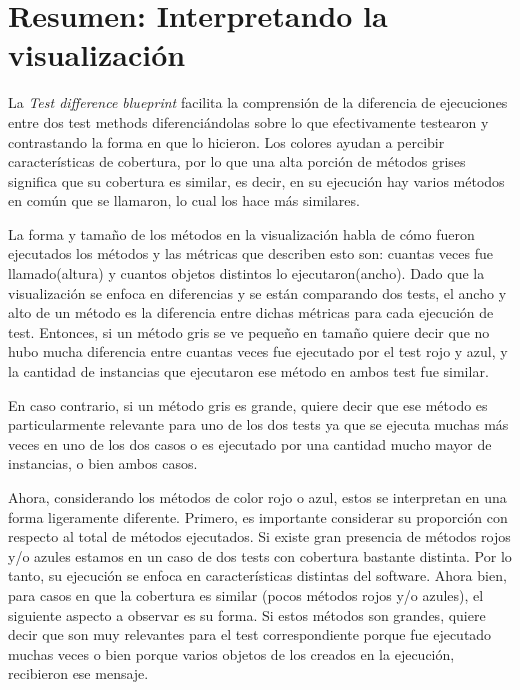 
\section{Resumen: Interpretando la visualización}


\par La \emph{Test difference blueprint} facilita la comprensión de la diferencia de ejecuciones entre dos test methods diferenciándolas sobre lo que efectivamente testearon y contrastando la forma en que lo hicieron. Los colores ayudan a percibir características de cobertura, por lo que una alta porción de métodos grises significa que su cobertura es similar, es decir, en su ejecución hay varios métodos en común que se llamaron, lo cual los hace más similares.

\par La forma y tamaño de los métodos en la visualización habla de cómo fueron ejecutados los métodos y las métricas que describen esto son: cuantas veces fue llamado(altura) y cuantos objetos distintos lo ejecutaron(ancho). Dado que la visualización se enfoca en diferencias y se están comparando dos tests, el ancho y alto de un método es la diferencia entre dichas métricas para cada ejecución de test. Entonces, si un método gris se ve pequeño en tamaño quiere decir que no hubo mucha diferencia entre cuantas veces fue ejecutado por el test rojo y azul, y la cantidad de instancias que ejecutaron ese método en ambos test fue similar. 

\par En caso contrario, si un método gris es grande, quiere decir que ese método es particularmente relevante para uno de los dos tests ya que se ejecuta muchas más veces en uno de los dos casos o es ejecutado por una cantidad mucho mayor de instancias, o bien ambos casos. 

\par Ahora, considerando los métodos de color rojo o azul, estos se interpretan en una forma ligeramente diferente. Primero, es importante considerar su proporción con respecto al total de métodos ejecutados. Si existe gran presencia de métodos rojos y/o azules estamos en un caso de dos tests con cobertura bastante distinta. Por lo tanto, su ejecución se enfoca en características distintas del software. Ahora bien, para casos en que la cobertura es similar (pocos métodos rojos y/o azules), el siguiente aspecto a observar es su forma. Si estos métodos son grandes, quiere decir que son muy relevantes para el test correspondiente porque fue ejecutado muchas veces o bien porque varios objetos de los creados en la ejecución, recibieron ese mensaje.

